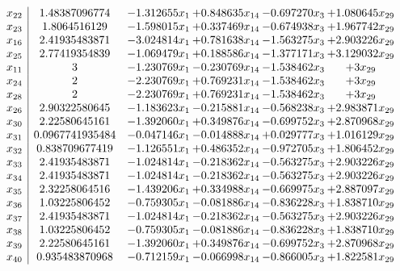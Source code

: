 \documentclass[11pt]{article}
\begin{document}
\[\begin{array}{c| c c@{\hskip 2pt} c@{\hskip 2pt} c@{\hskip 2pt} c@{\hskip 2pt} }
 x_{22}   &  1.48387096774 & -1.312655 x_{1} & + 0.848635 x_{14} & -0.697270 x_{3} & + 1.080645 x_{29}\\
 x_{23}   &  1.8064516129 & -1.598015 x_{1} & + 0.337469 x_{14} & -0.674938 x_{3} & + 1.967742 x_{29}\\
 x_{16}   &  2.41935483871 & -3.024814 x_{1} & + 0.781638 x_{14} & -1.563275 x_{3} & + 2.903226 x_{29}\\
 x_{25}   &  2.77419354839 & -1.069479 x_{1} & + 0.188586 x_{14} & -1.377171 x_{3} & + 3.129032 x_{29}\\
 x_{11}   &  3 & -1.230769 x_{1} & -0.230769 x_{14} & -1.538462 x_{3} & + 3 x_{29}\\
 x_{24}   &  2 & -2.230769 x_{1} & + 0.769231 x_{14} & -1.538462 x_{3} & + 3 x_{29}\\
 x_{28}   &  2 & -2.230769 x_{1} & + 0.769231 x_{14} & -1.538462 x_{3} & + 3 x_{29}\\
 x_{26}   &  2.90322580645 & -1.183623 x_{1} & -0.215881 x_{14} & -0.568238 x_{3} & + 2.983871 x_{29}\\
 x_{30}   &  2.22580645161 & -1.392060 x_{1} & + 0.349876 x_{14} & -0.699752 x_{3} & + 2.870968 x_{29}\\
 x_{31}   &  0.0967741935484 & -0.047146 x_{1} & -0.014888 x_{14} & + 0.029777 x_{3} & + 1.016129 x_{29}\\
 x_{32}   &  0.838709677419 & -1.126551 x_{1} & + 0.486352 x_{14} & -0.972705 x_{3} & + 1.806452 x_{29}\\
 x_{33}   &  2.41935483871 & -1.024814 x_{1} & -0.218362 x_{14} & -0.563275 x_{3} & + 2.903226 x_{29}\\
 x_{34}   &  2.41935483871 & -1.024814 x_{1} & -0.218362 x_{14} & -0.563275 x_{3} & + 2.903226 x_{29}\\
 x_{35}   &  2.32258064516 & -1.439206 x_{1} & + 0.334988 x_{14} & -0.669975 x_{3} & + 2.887097 x_{29}\\
 x_{36}   &  1.03225806452 & -0.759305 x_{1} & -0.081886 x_{14} & -0.836228 x_{3} & + 1.838710 x_{29}\\
 x_{37}   &  2.41935483871 & -1.024814 x_{1} & -0.218362 x_{14} & -0.563275 x_{3} & + 2.903226 x_{29}\\
 x_{38}   &  1.03225806452 & -0.759305 x_{1} & -0.081886 x_{14} & -0.836228 x_{3} & + 1.838710 x_{29}\\
 x_{39}   &  2.22580645161 & -1.392060 x_{1} & + 0.349876 x_{14} & -0.699752 x_{3} & + 2.870968 x_{29}\\
 x_{40}   &  0.935483870968 & -0.712159 x_{1} & -0.066998 x_{14} & -0.866005 x_{3} & + 1.822581 x_{29}\\

\end{array}\]
\end{document}
